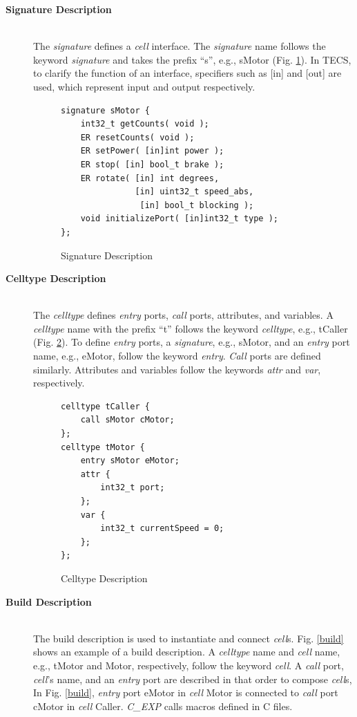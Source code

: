\documentclass[conference]{IEEEtran/IEEEtran}
\begin{document}
\begin{description}
    \item[{\bf Signature Description}]\mbox{}\\
        The {\it signature} defines a {\it cell} interface.
        The {\it signature} name follows the keyword {\it signature} and takes the prefix ``s'', e.g., sMotor (Fig. \ref{signature}).
        In TECS, to clarify the function of an interface, specifiers such as [in] and [out] are used, which represent input and output respectively.
\begin{figure}[t]
\centering
\begin{lstlisting}
signature sMotor {
    int32_t getCounts( void );
    ER resetCounts( void );
    ER setPower( [in]int power );
    ER stop( [in] bool_t brake );
    ER rotate( [in] int degrees,
               [in] uint32_t speed_abs,
                [in] bool_t blocking );
    void initializePort( [in]int32_t type );
};
\end{lstlisting}
\caption{Signature Description}
\label{signature}
\end{figure}
    \item[{\bf Celltype Description}]\mbox{}\\
        The {\it celltype} defines {\it entry} ports, {\it call} ports, attributes, and variables.
        A {\it celltype} name with the prefix ``t'' follows the keyword {\it celltype}, e.g., tCaller (Fig. \ref{celltype}).
        To define {\it entry} ports, a {\it signature}, e.g., sMotor, and an {\it entry} port name, e.g., eMotor, follow the keyword {\it entry}.
        {\it Call} ports are defined similarly.
        Attributes and variables follow the keywords {\it attr} and {\it var}, respectively.
\begin{figure}[t]
\centering
\begin{lstlisting}
celltype tCaller {
    call sMotor cMotor;
};
celltype tMotor {
    entry sMotor eMotor;
    attr {
        int32_t port;
    };
    var {
        int32_t currentSpeed = 0;
    };
};
\end{lstlisting}
\caption{Celltype Description}
\label{celltype}
\end{figure}
    \item[{\bf Build Description}]\mbox{}\\
        The build description is used to instantiate and connect {\it cell}s.
        Fig. \ref{build} shows an example of a build description.
        A {\it celltype} name and {\it cell} name, e.g., tMotor and Motor, respectively, follow the keyword {\it cell}.
        A {\it call} port, {\it cell}'s name, and an {\it entry} port are described in that order to compose {\it cell}s,
        In Fig. \ref{build}, {\it entry} port eMotor in {\it cell} Motor is connected to {\it call} port cMotor in {\it cell} Caller.
        {\it C\_EXP} calls macros defined in C files.


\end{description}
\end{document}
